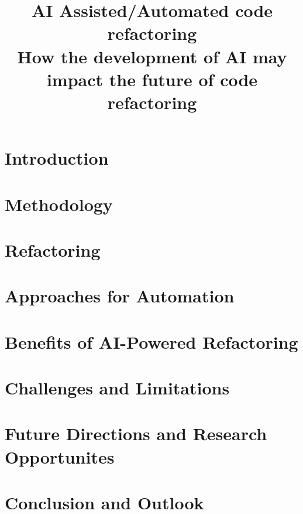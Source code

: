 \documentclass[conference]{IEEEtran}
\begin{document}
\title{AI Assisted/Automated code refactoring\\
{\footnotesize How the development of AI may impact the future of code refactoring}
}

\author{
    \and
}

\maketitle



\section{Introduction}\label{introduction}


\section{Methodology}


\section{Refactoring}\label{refactoring}


\section{Approaches for Automation}\label{automation}

\section{Benefits of AI-Powered Refactoring}\label{benefits}


\section{Challenges and Limitations}\label{challenges}


\section{Future Directions and Research Opportunites}


\section{Conclusion and Outlook}


\end{document}
